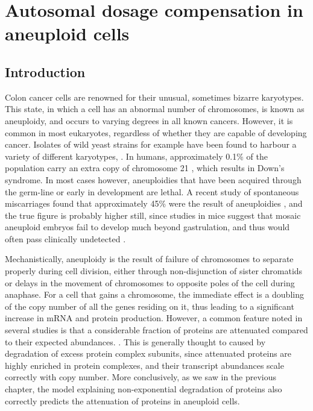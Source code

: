 \documentclass[a4paper,11pt,twoside,openright]{scrbook}
\begin{document}
\chapter{Autosomal dosage compensation in aneuploid cells}

\section{Introduction}

Colon cancer cells are renowned for their unusual, sometimes bizarre karyotypes. This state, in which a cell has an abnormal number of chromosomes, is known as aneuploidy, and occurs to varying degrees in all known cancers. However, it is common in most eukaryotes, regardless of whether they are capable of developing cancer. Isolates of wild yeast strains for example have been found to harbour a variety of different karyotypes, \cite{Hose2015}. In humans, approximately 0.1\% of the population carry an extra copy of chromosome 21 \cite{Presson2013}, which results in Down's syndrome. In most cases however, aneuploidies that have been acquired through the germ-line or early in development are lethal. A recent study of spontaneous miscarriages found that approximately 45\% were the result of aneuploidies \cite{Jia2015}, and the true figure is probably higher still, since studies in mice suggest that mosaic aneuploid embryos fail to develop much beyond gastrulation, and thus would often pass clinically undetected \cite{Lightfoot2006}.

Mechanistically, aneuploidy is the result of failure of chromosomes to separate properly during cell division, either through non-disjunction of sister chromatids or delays in the movement of chromosomes to opposite poles of the cell during anaphase. For a cell that gains a chromosome, the immediate effect is a doubling of the copy number of all the genes residing on it, thus leading to a significant increase in mRNA and protein production. However, a common feature noted in several studies is that a considerable fraction of proteins are attenuated compared to their expected abundances. \cite{Stingele2012,Dephoure2014,Goncalves2017}. This is generally thought to caused by degradation of excess protein complex subunits, since attenuated proteins are highly enriched in protein complexes, and their transcript abundances scale correctly with copy number. More conclusively, as we saw in the previous chapter, the model explaining non-exponential degradation of proteins also correctly predicts the attenuation of proteins in aneuploid cells.
\end{document}

